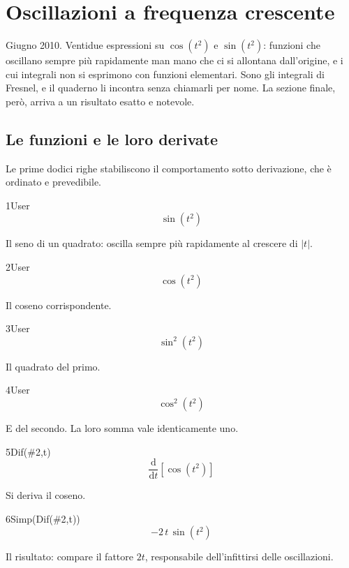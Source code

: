 \chapter{Oscillazioni a frequenza crescente}
\label{cap:cost2}

Giugno 2010. Ventidue espressioni su $\cos(t^2)$ e $\sin(t^2)$: funzioni che oscillano sempre più rapidamente man mano che ci si allontana dall'origine, e i cui integrali non si esprimono con funzioni elementari. Sono gli integrali di Fresnel, e il quaderno li incontra senza chiamarli per nome. La sezione finale, però, arriva a un risultato esatto e notevole.

\section{Le funzioni e le loro derivate}

Le prime dodici righe stabiliscono il comportamento sotto derivazione, che è ordinato e prevedibile.

\begin{espr}{1}{User}{}
\[
\sin\!\left(t^{2}\right)
\]
\end{espr}
Il seno di un quadrato: oscilla sempre più rapidamente al crescere di $|t|$.

\begin{espr}{2}{User}{}
\[
\cos\!\left(t^{2}\right)
\]
\end{espr}
Il coseno corrispondente.

\begin{espr}{3}{User}{}
\[
\sin^{2}\!\left(t^{2}\right)
\]
\end{espr}
Il quadrato del primo.

\begin{espr}{4}{User}{}
\[
\cos^{2}\!\left(t^{2}\right)
\]
\end{espr}
E del secondo. La loro somma vale identicamente uno.

\begin{espr}{5}{Dif(\#2,t)}{}
\[
\frac{\mathrm{d}}{\mathrm{d}t}\!\left[\cos\!\left(t^{2}\right)\right]
\]
\end{espr}
Si deriva il coseno.

\begin{espr}{6}{Simp(Dif(\#2,t))}{}
\[
-2\, t\, \sin\!\left(t^{2}\right)
\]
\end{espr}
Il risultato: compare il fattore $2t$, responsabile dell'infittirsi delle oscillazioni.

